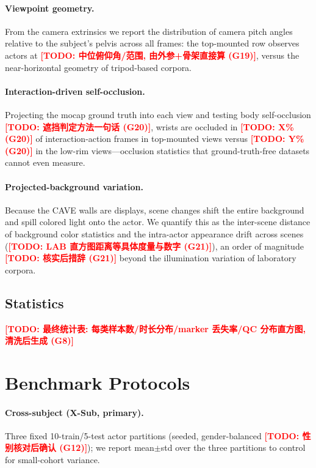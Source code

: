 \documentclass[10pt,twocolumn,letterpaper]{article}
\newcommand{\todocjkfont}{}
\newif\iftodos \todostrue   %
\newcommand{\todo}[1]{\iftodos\textcolor{red}{\textbf{[TODO: {\todocjkfont #1}]}}\fi}
\begin{document}
\paragraph{Viewpoint geometry.}
From the camera extrinsics we report the distribution of camera pitch
angles relative to the subject's pelvis across all frames: the top-mounted
row observes actors at \todo{中位俯仰角/范围, 由外参+骨架直接算 (G19)},
versus the near-horizontal geometry of tripod-based corpora.
\paragraph{Interaction-driven self-occlusion.}
Projecting the mocap ground truth into each view and testing body
self-occlusion \todo{遮挡判定方法一句话 (G20)}, wrists are occluded in
\todo{X\% (G20)} of interaction-action frames in top-mounted views versus
\todo{Y\% (G20)} in the low-rim views---occlusion statistics that
ground-truth-free datasets cannot even measure.
\paragraph{Projected-background variation.}
Because the CAVE walls are displays, scene changes shift the entire
background and spill colored light onto the actor. We quantify this as the
inter-scene distance of background color statistics and the intra-actor
appearance drift across scenes (\todo{LAB 直方图距离等具体度量与数字
(G21)}), an order of magnitude \todo{核实后措辞 (G21)} beyond the
illumination variation of laboratory corpora.

\subsection{Statistics}
\todo{最终统计表: 每类样本数/时长分布/marker 丢失率/QC 分布直方图,
清洗后生成 (G8)}

\section{Benchmark Protocols}
\paragraph{Cross-subject (X-Sub, primary).}
Three fixed 10-train/5-test actor partitions (seeded, gender-balanced
\todo{性别核对后确认 (G12)}); we report mean$\pm$std over the three
partitions to control for small-cohort variance.
\end{document}
